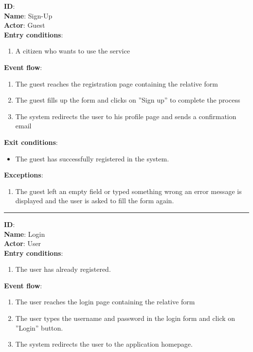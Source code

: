 \begin{enumerate}
\begin{itemize}
		\textbf{ID}:  \\
		\textbf{Name}: Sign-Up \\
		\textbf{Actor}: Guest \\
		\textbf{Entry conditions}:
		\begin{enumerate}
			\item{A citizen who wants to use the service}
		\end{enumerate}
		\textbf{Event flow}:
		\begin{enumerate}
			\item{The guest reaches the registration page containing the relative form}
			\item{The guest ﬁlls up the form and clicks on ”Sign up” to complete the process}
			\item{The system redirects the user to his proﬁle page and sends a conﬁrmation email}

		\end{enumerate}
		\textbf{Exit conditions}:
		\begin{itemize}
			\item{The guest has successfully registered in the system.}
		\end{itemize}
		\textbf{Exceptions}:
		\begin{enumerate}
      		\item{The guest left an empty ﬁeld or typed something wrong an error message is displayed and the user is asked to ﬁll the form again.}
 		   \end{enumerate}
		\rule{\linewidth}{0.4pt}

		\textbf{ID}: \\
		\textbf{Name}: Login \\
		\textbf{Actor}: User \\
		\textbf{Entry conditions}:
		\begin{enumerate}
			\item{The user has already registered.}
		\end{enumerate}
		\textbf{Event flow}:
		\begin{enumerate}
			\item{The user reaches the login page containing the relative form}
			\item{The user types the username and password in the login form and click on ”Login” button.}
			\item{The system redirects the user to the application homepage.}


\end{enumerate}
\end{itemize}
\end{enumerate}
